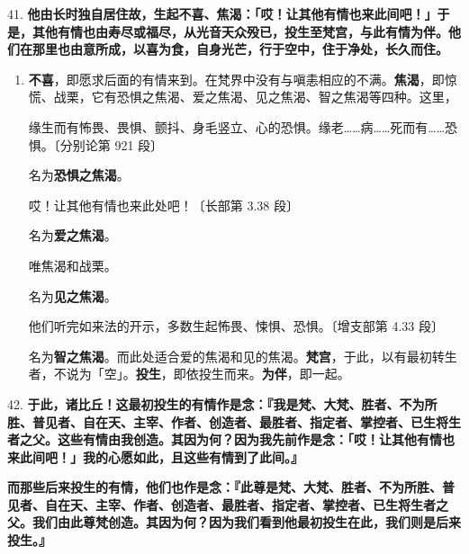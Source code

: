 {\Large 41.} \textbf{他由长时独自居住故，生起不喜、焦渴：「哎！让其他有情也来此间吧！」于是，其他有情也由寿尽或福尽，从光音天众殁已，投生至梵宫，与此有情为伴。他们在那里也由意所成，以喜为食，自身光芒，行于空中，住于净处，长久而住。}

\begin{enumerate}\item \textbf{不喜}，即愿求后面的有情来到。在梵界中没有与嗔恚相应的不满。\textbf{焦渴}，即惊慌、战栗，它有恐惧之焦渴、爱之焦渴、见之焦渴、智之焦渴等四种。这里，\begin{quoting}缘生而有怖畏、畏惧、颤抖、身毛竖立、心的恐惧。缘老……病……死而有……恐惧。{\bluefootnotesize 〔分别论第 921 段〕}\end{quoting}名为\textbf{恐惧之焦渴}。\begin{quoting}哎！让其他有情也来此处吧！{\bluefootnotesize 〔长部第 3.38 段〕}\end{quoting}名为\textbf{爱之焦渴}。\begin{quoting}唯焦渴和战栗。\end{quoting}名为\textbf{见之焦渴}。\begin{quoting}他们听完如来法的开示，多数生起怖畏、悚惧、恐惧。{\bluefootnotesize 〔增支部第 4.33 段〕}\end{quoting}名为\textbf{智之焦渴}。而此处适合爱的焦渴和见的焦渴。\textbf{梵宫}，于此，以有最初转生者，不说为「空」。\textbf{投生}，即依投生而来。\textbf{为伴}，即一起。\end{enumerate}

{\Large 42.} \textbf{于此，诸比丘！这最初投生的有情作是念：『我是梵、大梵、胜者、不为所胜、普见者、自在天、主宰、作者、创造者、最胜者、指定者、掌控者、已生将生者之父。这些有情由我创造。其因为何？因为我先前作是念：「哎！让其他有情也来此间吧！」我的心愿如此，且这些有情到了此间。』}

\textbf{而那些后来投生的有情，他们也作是念：『此尊是梵、大梵、胜者、不为所胜、普见者、自在天、主宰、作者、创造者、最胜者、指定者、掌控者、已生将生者之父。我们由此尊梵创造。其因为何？因为我们看到他最初投生在此，我们则是后来投生。』}

